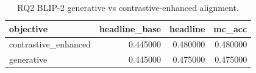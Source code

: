 \begin{table}
\caption{RQ2 BLIP-2 generative vs contrastive-enhanced alignment.}
\label{tab:rq2_blip2}
\begin{tabular}{lrrr}
\toprule
objective & headline_base & headline & mc_acc \\
\midrule
contrastive_enhanced & 0.445000 & 0.480000 & 0.480000 \\
generative & 0.445000 & 0.475000 & 0.475000 \\
\bottomrule
\end{tabular}
\end{table}
